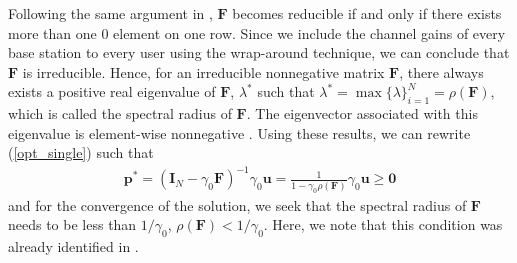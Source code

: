 \documentclass[conference,letterpaper,final,10pt]{IEEEtran}
\begin{document}
Following the same argument in \cite{Goodman}, $\textbf{F}$ becomes reducible if and only if there exists more than one $0$ element on one row. Since we include the channel gains of every base station to every user using the wrap-around technique, we can conclude that $\textbf{F}$ is irreducible. Hence, for an irreducible nonnegative matrix $\textbf{F}$, there always exists a positive real eigenvalue of $\textbf{F}$, $\lambda^*$ such that $\lambda^* = \max \{\lambda\}_{i=1}^N = \rho(\textbf{F})$, which is called the spectral radius of $\textbf{F}$. The eigenvector associated with this eigenvalue is element-wise nonnegative \cite{TheoryOfMatrices}. Using these results, we can rewrite (\ref{opt_single}) such that
\begin{align} \textbf{p}^* = (\textbf{I}_N - \gamma_0\textbf{F})^{-1} \gamma_0 \textbf{u} = \frac{1}{1-\gamma_0\rho(\textbf{F})} \gamma_0\textbf{u} \geq \textbf{0}\end{align}
and for the convergence of the solution, we seek that the spectral radius of $\textbf{F}$ needs to be less than $1/\gamma_0$, $\rho(\textbf{F})<1/\gamma_0$. Here, we note that this condition was already identified in \cite{ZanderCentral,Zender,Goodman,Foschini,GoodmanDPC}.
\end{document}
